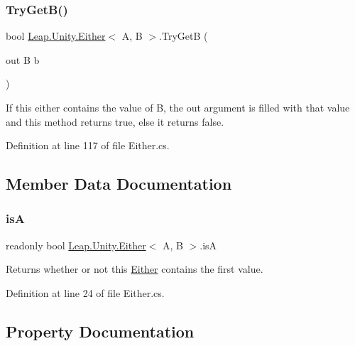 \mbox{\label{struct_leap_1_1_unity_1_1_either_a2936191d85fa4d7dcb85c12ca2f2f471}} 
\subsubsection{\texorpdfstring{TryGetB()}{TryGetB()}}
{\footnotesize\ttfamily bool \mbox{\hyperlink{struct_leap_1_1_unity_1_1_either}{Leap.\+Unity.\+Either}}$<$ A, B $>$.Try\+GetB (\begin{DoxyParamCaption}\item[{out B}]{b }\end{DoxyParamCaption})}



If this either contains the value of B, the out argument is filled with that value and this method returns true, else it returns false. 



Definition at line 117 of file Either.\+cs.



\subsection{Member Data Documentation}
\mbox{\label{struct_leap_1_1_unity_1_1_either_a40ac2be2f7b6cf84befee547151bab6f}} 
\subsubsection{\texorpdfstring{isA}{isA}}
{\footnotesize\ttfamily readonly bool \mbox{\hyperlink{struct_leap_1_1_unity_1_1_either}{Leap.\+Unity.\+Either}}$<$ A, B $>$.isA}



Returns whether or not this \mbox{\hyperlink{struct_leap_1_1_unity_1_1_either}{Either}} contains the first value. 



Definition at line 24 of file Either.\+cs.



\subsection{Property Documentation}
\mbox{\label{struct_leap_1_1_unity_1_1_either_ac7c612037b34bbfb23251111dae09928}} 
